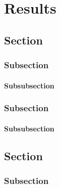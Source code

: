 

\chapter{Results}  

\section{Section}
\noindent \lipsum[1][1-3] %

\subsection{Subsection}
\noindent \lipsum[1][3-5] %

\subsubsection{Subsubsection}
\noindent \blindtext %

\subsection{Subsection}
\noindent \lipsum[1][2-5] %

\subsubsection{Subsubsection}
\noindent \lipsum[1][1-5] %

\section{Section}
\noindent \lipsum[1][5-8] %

\subsection{Subsection}
\noindent \lipsum[1][9-15] %


